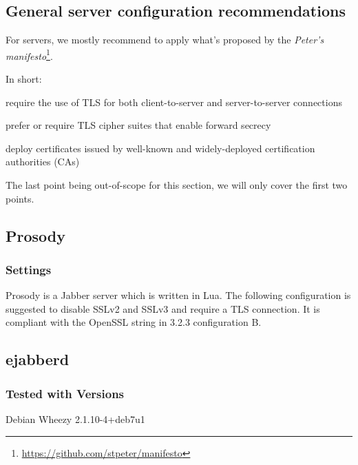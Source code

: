 \gdef\currentsectionname{IM}
\subsection{General server configuration recommendations}

For servers, we mostly recommend to apply what's proposed by the \emph{Peter's manifesto}\footnote{\url{https://github.com/stpeter/manifesto}}.

In short:
\begin{itemize*}
    \item require the use of TLS for both client-to-server and server-to-server connections
    \item prefer or require TLS cipher suites that enable forward secrecy
    \item deploy certificates issued by well-known and widely-deployed certification authorities (CAs)
\end{itemize*}

The last point being out-of-scope for this section, we will only cover the first two points.


\subsection{Prosody}
\subsubsection{Settings}
Prosody is a Jabber server which is written in Lua. 
The following configuration is suggested to disable SSLv2 and SSLv3 and require a TLS connection. It is compliant with the OpenSSL string in 3.2.3 configuration B.




\subsection{ejabberd}

\subsubsection{Tested with Versions}
\begin{itemize*}
  \item Debian Wheezy 2.1.10-4+deb7u1
\end{itemize*}

